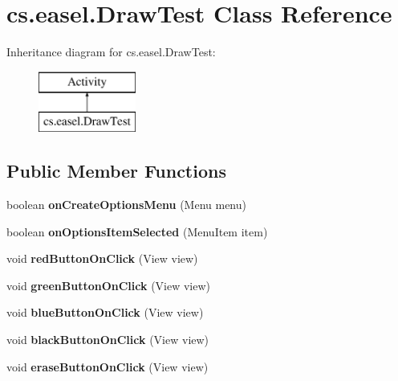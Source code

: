 \hypertarget{classcs_1_1easel_1_1_draw_test}{\section{cs.\+easel.\+Draw\+Test Class Reference}
\label{classcs_1_1easel_1_1_draw_test}
}
Inheritance diagram for cs.\+easel.\+Draw\+Test\+:\begin{figure}[H]
\begin{center}
\leavevmode
\includegraphics[height=2.000000cm]{classcs_1_1easel_1_1_draw_test}
\end{center}
\end{figure}
\subsection*{Public Member Functions}
\begin{DoxyCompactItemize}
\item 
\hypertarget{classcs_1_1easel_1_1_draw_test_a039580e2b2bd6628e4645c09f7691061}{boolean {\bfseries on\+Create\+Options\+Menu} (Menu menu)}\label{classcs_1_1easel_1_1_draw_test_a039580e2b2bd6628e4645c09f7691061}

\item 
\hypertarget{classcs_1_1easel_1_1_draw_test_a14ca9caff67166d1218da1f2eadeb06e}{boolean {\bfseries on\+Options\+Item\+Selected} (Menu\+Item item)}\label{classcs_1_1easel_1_1_draw_test_a14ca9caff67166d1218da1f2eadeb06e}

\item 
\hypertarget{classcs_1_1easel_1_1_draw_test_aa4451d77bc71016c1ee7780ac6430f13}{void {\bfseries red\+Button\+On\+Click} (View view)}\label{classcs_1_1easel_1_1_draw_test_aa4451d77bc71016c1ee7780ac6430f13}

\item 
\hypertarget{classcs_1_1easel_1_1_draw_test_a0bb178c4c7a4150ff1da220bc08d02ed}{void {\bfseries green\+Button\+On\+Click} (View view)}\label{classcs_1_1easel_1_1_draw_test_a0bb178c4c7a4150ff1da220bc08d02ed}

\item 
\hypertarget{classcs_1_1easel_1_1_draw_test_a22c03a4d88104dce37783b63fa7db681}{void {\bfseries blue\+Button\+On\+Click} (View view)}\label{classcs_1_1easel_1_1_draw_test_a22c03a4d88104dce37783b63fa7db681}

\item 
\hypertarget{classcs_1_1easel_1_1_draw_test_aba55091ae758713bbefd5ae7071e0021}{void {\bfseries black\+Button\+On\+Click} (View view)}\label{classcs_1_1easel_1_1_draw_test_aba55091ae758713bbefd5ae7071e0021}

\item 
\hypertarget{classcs_1_1easel_1_1_draw_test_a341a6c3968c3da92a5320df2874bbd3b}{void {\bfseries erase\+Button\+On\+Click} (View view)}\label{classcs_1_1easel_1_1_draw_test_a341a6c3968c3da92a5320df2874bbd3b}

\end{DoxyCompactItemize}
